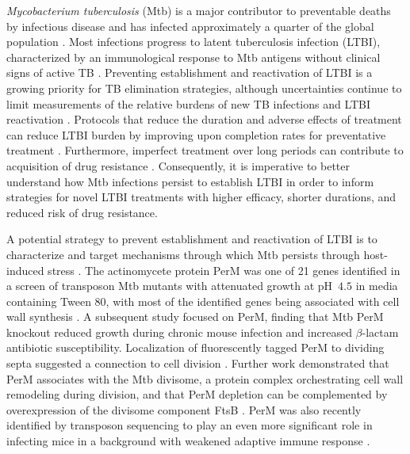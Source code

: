 \documentclass[twocolumn,pdflatex,sn-nature]{sn-jnl}%
\newcommand\mtb{Mtb}
\newcommand\mtbfull{\textit{Mycobacterium tuberculosis}}
\begin{document}
\mtbfull{} (\mtb{}) is a major contributor to preventable deaths by infectious disease and has infected approximately a quarter of the global population \citep{houbenGlobalBurdenLatent2016}. Most infections progress to latent tuberculosis infection (LTBI), characterized by an immunological response to \mtb{} antigens without clinical signs of active TB \citep{whoLatentTuberculosisInfection2018}. Preventing establishment and reactivation of LTBI is a growing priority for TB elimination strategies, although uncertainties continue to limit measurements of the relative burdens of new TB infections and LTBI reactivation \citep{daleQuantifyingRatesLate2021}. Protocols that reduce the duration and adverse effects of treatment can reduce LTBI burden by improving upon completion rates for preventative treatment \citep{assefaEfficacySafetyDifferent2023}. Furthermore, imperfect treatment over long periods can contribute to acquisition of drug resistance \citep{liAcquiredResistanceIsoniazid2021}. Consequently, it is imperative to better understand how \mtb{} infections persist to establish LTBI in order to inform strategies for novel LTBI treatments with higher efficacy, shorter durations, and reduced risk of drug resistance.

A potential strategy to prevent establishment and reactivation of LTBI is to characterize and target mechanisms through which \mtb{} persists through host-induced stress \citep{dartoisAntituberculosisTreatmentStrategies2022}. The actinomycete protein PerM was one of 21 genes identified in a screen of transposon \mtb{} mutants with attenuated growth at pH~$4.5$ in media containing Tween 80, with most of the identified genes being associated with cell wall synthesis \citep{vandalMembraneProteinPreserves2008}. A subsequent study focused on PerM, finding that \mtb{} PerM knockout reduced growth during chronic mouse infection and increased $\beta$-lactam antibiotic susceptibility. Localization of fluorescently tagged PerM to dividing septa suggested a connection to cell division \citep{goodsmithDisruptionTuberculosisMembrane2015}. Further work demonstrated that PerM associates with the \mtb{} divisome, a protein complex orchestrating cell wall remodeling during division, and that PerM depletion can be complemented by overexpression of the divisome component FtsB \citep{wangPersistentMycobacteriumTuberculosis2019}. PerM was also recently identified by transposon sequencing to play an even more significant role in infecting mice in a background with weakened adaptive immune response \citep{meadeGenomewideScreenIdentifies2023}.
\end{document}

